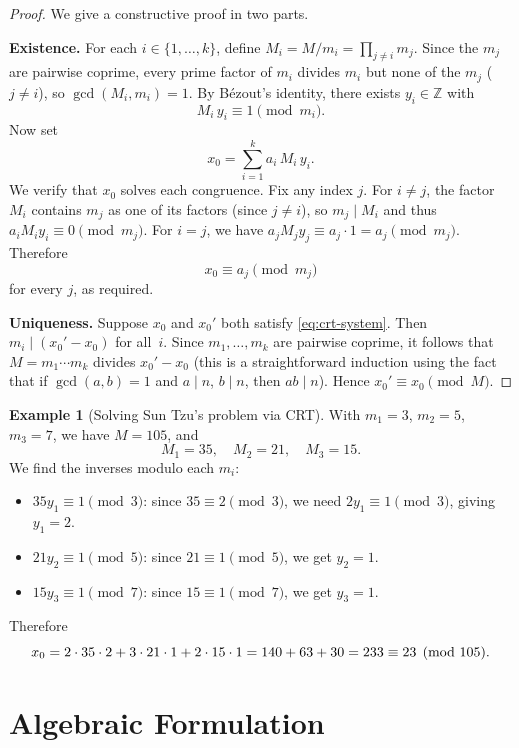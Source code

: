 \documentclass[12pt,a4paper,openany]{book}
\theoremstyle{definition}
\newtheorem{example}[definition]{Example}
\theoremstyle{plain}
\theoremstyle{remark}
\newcommand{\Z}{\mathbb{Z}}
\begin{document}
\begin{proof}
We give a constructive proof in two parts.

\medskip\noindent\textbf{Existence.}
For each $i \in \{1, \ldots, k\}$, define $M_i = M / m_i = \prod_{j \neq i} m_j$.
Since the $m_j$ are pairwise coprime, every prime factor of $m_i$ divides $m_i$
but none of the $m_j$ ($j \neq i$), so $\gcd(M_i, m_i) = 1$.
By B\'ezout's identity, there exists $y_i \in \Z$ with
\[
  M_i \, y_i \equiv 1 \pmod{m_i}.
\]
Now set
\[
  x_0 = \sum_{i=1}^{k} a_i \, M_i \, y_i.
\]
We verify that $x_0$ solves each congruence. Fix any index $j$. For $i \neq j$,
the factor $M_i$ contains $m_j$ as one of its factors (since $j \neq i$), so
$m_j \mid M_i$ and thus $a_i M_i y_i \equiv 0 \pmod{m_j}$.
For $i = j$, we have $a_j M_j y_j \equiv a_j \cdot 1 = a_j \pmod{m_j}$.
Therefore
\[
  x_0 \equiv a_j \pmod{m_j}
\]
for every $j$, as required.

\medskip\noindent\textbf{Uniqueness.}
Suppose $x_0$ and $x_0'$ both satisfy \eqref{eq:crt-system}.
Then $m_i \mid (x_0' - x_0)$ for all~$i$.
Since $m_1, \ldots, m_k$ are pairwise coprime, it follows that
$M = m_1 \cdots m_k$ divides $x_0' - x_0$
(this is a straightforward induction using the fact that if $\gcd(a, b) = 1$
and $a \mid n$, $b \mid n$, then $ab \mid n$).
Hence $x_0' \equiv x_0 \pmod{M}$.
\end{proof}

\begin{example}[Solving Sun Tzu's problem via CRT]
\label{ex:sun-tzu-crt}
With $m_1 = 3$, $m_2 = 5$, $m_3 = 7$, we have $M = 105$, and
\[
  M_1 = 35, \quad M_2 = 21, \quad M_3 = 15.
\]
We find the inverses modulo each $m_i$:
\begin{itemize}
  \item $35 y_1 \equiv 1 \pmod{3}$: since $35 \equiv 2 \pmod{3}$, we need $2y_1 \equiv 1 \pmod{3}$, giving $y_1 = 2$.
  \item $21 y_2 \equiv 1 \pmod{5}$: since $21 \equiv 1 \pmod{5}$, we get $y_2 = 1$.
  \item $15 y_3 \equiv 1 \pmod{7}$: since $15 \equiv 1 \pmod{7}$, we get $y_3 = 1$.
\end{itemize}
Therefore
\[
  x_0 = 2 \cdot 35 \cdot 2 + 3 \cdot 21 \cdot 1 + 2 \cdot 15 \cdot 1
       = 140 + 63 + 30 = 233 \equiv 23 \pmod{105}. \qedhere
\]
\end{example}

\section{Algebraic Formulation}
\label{sec:crt-algebraic}
\end{document}
